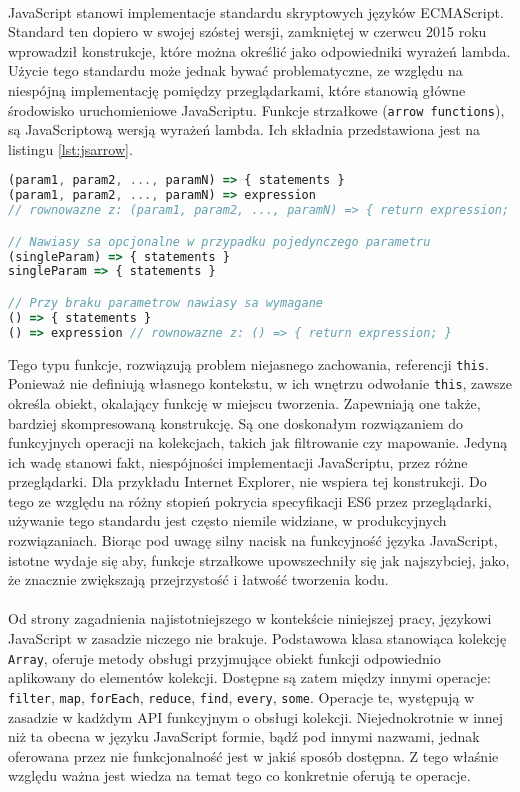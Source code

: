 \documentclass[a4paper,10pt]{report}
\begin{document}
\paragraph{}
JavaScript stanowi implementacje standardu skryptowych języków ECMAScript. Standard ten dopiero w swojej szóstej wersji, zamkniętej w czerwcu 2015 roku wprowadził konstrukcje, które można określić jako odpowiedniki wyrażeń lambda. Użycie tego standardu może jednak bywać problematyczne, ze względu na niespójną implementację pomiędzy przeglądarkami, które stanowią główne środowisko uruchomieniowe JavaScriptu. 
Funkcje strzałkowe (\verb|arrow functions|), są JavaScriptową wersją wyrażeń lambda. Ich składnia przedstawiona jest na listingu \ref{lst:jsarrow}.
\begin{lstlisting}[caption={Funkcje strzałkowe \cite{lambdajssyntax}},label={lst:jsarrow},language=Javascript]
(param1, param2, ..., paramN) => { statements }
(param1, param2, ..., paramN) => expression
// rownowazne z: (param1, param2, ..., paramN) => { return expression; }

// Nawiasy sa opcjonalne w przypadku pojedynczego parametru
(singleParam) => { statements }
singleParam => { statements }

// Przy braku parametrow nawiasy sa wymagane
() => { statements }
() => expression // rownowazne z: () => { return expression; }
\end{lstlisting}
Tego typu funkcje, rozwiązują problem niejasnego zachowania, referencji \verb|this|. Ponieważ nie definiują własnego kontekstu, w ich wnętrzu odwołanie \verb|this|, zawsze określa obiekt, okalający funkcję w miejscu tworzenia. Zapewniają one także, bardziej skompresowaną konstrukcję. Są one doskonałym rozwiązaniem do funkcyjnych operacji na kolekcjach, takich jak filtrowanie czy mapowanie. Jedyną ich wadę stanowi fakt, niespójności implementacji JavaScriptu, przez różne przeglądarki. Dla przykładu Internet Explorer, nie wspiera tej konstrukcji. Do tego ze względu na różny stopień pokrycia specyfikacji ES6 przez przeglądarki, używanie tego standardu jest często niemile widziane, w produkcyjnych rozwiązaniach. Biorąc pod uwagę silny nacisk na funkcyjność języka JavaScript, istotne wydaje się aby, funkcje strzałkowe upowszechniły się jak najszybciej, jako, że znacznie zwiększają przejrzystość i łatwość tworzenia kodu.
\paragraph{}
Od strony zagadnienia najistotniejszego w kontekście niniejszej pracy, językowi JavaScript w zasadzie niczego nie brakuje. Podstawowa klasa stanowiąca kolekcję \verb|Array|, oferuje metody obsługi przyjmujące obiekt funkcji odpowiednio aplikowany do elementów kolekcji. Dostępne są zatem między innymi operacje: \verb|filter|, \verb|map|, \verb|forEach|, \verb|reduce|, \verb|find|, \verb|every|, \verb|some|. Operacje te, występują w zasadzie w kadżdym API funkcyjnym o obsługi kolekcji. Niejednokrotnie w innej niż ta obecna w języku JavaScript formie, bądź pod innymi nazwami, jednak oferowana przez nie funkcjonalność jest w jakiś sposób dostępna. Z tego właśnie względu ważna jest wiedza na temat tego co konkretnie oferują te operacje.
\end{document}
